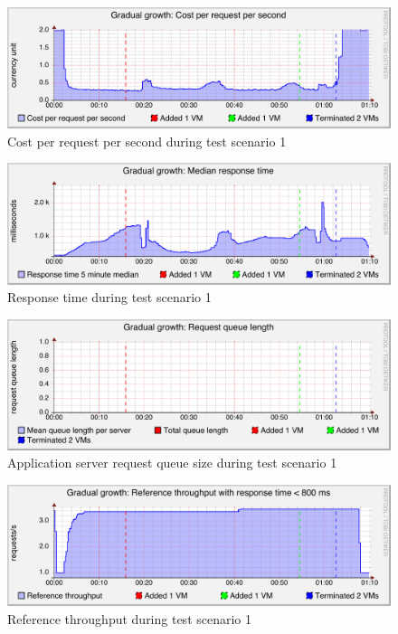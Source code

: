 \documentclass[english]{tktltiki2}
\theoremstyle{definition}
\theoremstyle{remark}
\begin{document}
\begin{figure}[htbp]
	\includegraphics[width=\textwidth]{images/costperrequestpersecondgraph-test21}
	\caption{Cost per request per second during test scenario 1}
	\label{fig:costScenario1}
\end{figure}

\begin{figure}[htbp]
	\includegraphics[width=\textwidth]{images/responsetimegraph-test21}
	\caption{Response time during test scenario 1}
	\label{fig:responseTimeScenario1}
\end{figure}

\begin{figure}[htbp]
	\includegraphics[width=\textwidth]{images/queuesizegraph-test21}
	\caption{Application server request queue size during test scenario 1}
	\label{fig:queueScenario1}
\end{figure}

\begin{figure}[htbp]
	\includegraphics[width=\textwidth]{images/referencethroughputgraph-test21}
	\caption{Reference throughput during test scenario 1}
	\label{fig:referenceThroughputScenario1}
\end{figure}
\end{document}
